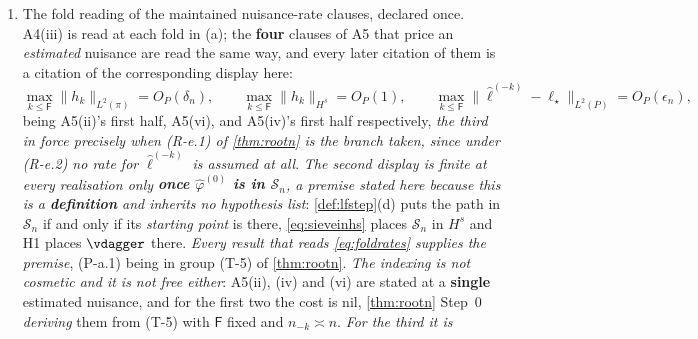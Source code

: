 \begin{definition}
\begin{enumerate}
\begin{enumerate}
\end{enumerate}
\item[(d)] The fold reading of the maintained nuisance-rate clauses, declared once. A4(iii) is read
at each fold in (a); the \textbf{four} clauses of A5 that price an \emph{estimated} nuisance are read the
same way, and every later citation of them is a citation of the corresponding display here:
\begin{equation}\label{eq:foldrates}
\max_{k\le\mathsf F}\big\|h_k\big\|_{L^{2}(\pi)}=O_P(\delta_n),
\qquad
\max_{k\le\mathsf F}\big\|h_k\big\|_{H^{s}}=O_P(1),
\qquad
\max_{k\le\mathsf F}\big\|\hat\ell^{(-k)}-\ell_\star\big\|_{L^{2}(P)}=O_P(\epsilon_n),
\end{equation}
being A5(ii)'s first half, A5(vi), and A5(iv)'s first half respectively, \emph{the third in force precisely
when (R-e.1) of \cref{thm:rootn} is the branch taken, since under (R-e.2) no rate for $\hat\ell^{(-k)}$ is
assumed at all}. \emph{The second display is finite at every realisation only
\textbf{once $\hat\varphi^{(0)}$ is in $\mathcal S_n$}, a premise stated here because this is a
\textbf{definition} and inherits no hypothesis list}: \cref{def:lfstep}\textup{(d)} puts the path in
$\mathcal S_n$ if and only if its \emph{starting point} is there, \eqref{eq:sieveinhs} places
$\mathcal S_n$ in $H^{s}$ and H1 places $\vdagger$ there. \emph{Every result that reads
\eqref{eq:foldrates} supplies the premise}, (P-a.1) being in group (T-5) of \cref{thm:rootn}.
\emph{The indexing is not cosmetic and it is not free either}: A5(ii), (iv) and (vi) are stated at a
\textbf{single} estimated nuisance, and for the first two the cost is nil, \cref{thm:rootn} Step~0
\emph{deriving} them from (T-5) with $\mathsf F$ fixed and $n_{-k}\asymp n$. \emph{For the third it is
}
\end{enumerate}
\end{definition}
